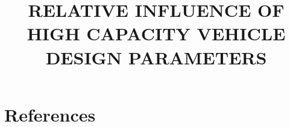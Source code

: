 \documentclass[11pt, a4paper]{report}
\title{RELATIVE INFLUENCE OF HIGH CAPACITY VEHICLE DESIGN PARAMETERS}
\begin{document}
\begin{preamble}
\maketitle 

\end{preamble}











\sloppy
\chapter*{References}\label{section:references}
\printbibliography[heading=none]
\fussy


\appendix %




\end{document}

